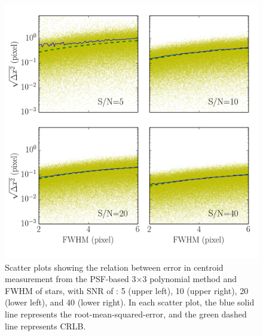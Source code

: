 \documentclass[12pt, preprint]{aastex}
\begin{document}
\begin{figure}[!htb]
  \includegraphics[width=\linewidth]{fwhm_psfpoly.png}
\endminipage
\caption{Scatter plots showing the relation between error in centroid measurement
from the PSF-based 3$\times$3 polynomial method and FWHM of stars, with SNR  of : 5 (upper left),
10 (upper right), 20 (lower left), and 40 (lower right). In each scatter plot, the blue solid
 line represents the root-mean-squared-error, and the green dashed line represents CRLB.}\label{6}
\end{figure}
\end{document}
